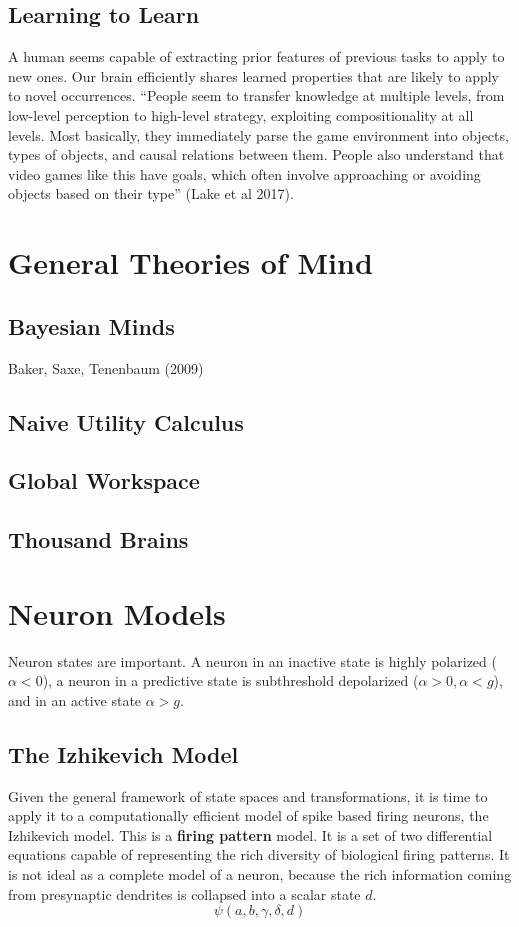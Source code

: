 \documentclass[11pt, a4paper]{article}
\begin{document}
\subsection{Learning to Learn}
A human seems capable of extracting prior features of previous tasks to apply to new ones. Our brain efficiently shares learned properties that are likely to apply to novel occurrences. ``People seem to transfer knowledge at multiple levels, from low-level perception to high-level strategy, exploiting compositionality at all levels. Most basically, they immediately parse the game environment into objects, types of objects, and causal relations between them. People also understand that video games like this have goals, which often involve approaching or avoiding objects based on their type'' (Lake et al 2017).

\section{General Theories of Mind}
\subsection{Bayesian Minds}
Baker, Saxe, Tenenbaum (2009)

\subsection{Naive Utility Calculus}

\subsection{Global Workspace}

\subsection{Thousand Brains}




\section{Neuron Models}
Neuron states are important. A neuron in an inactive state is highly polarized ($\alpha < 0$), a neuron in a predictive state is subthreshold depolarized ($\alpha > 0, \alpha < g$), and in an active state $\alpha > g$.


\subsection{The Izhikevich Model}
Given the general framework of state spaces and transformations, it is time to apply it to a computationally efficient model of spike based firing neurons, the Izhikevich model. This is a \textbf{firing pattern} model. It is a set of two differential equations capable of representing the rich diversity of biological firing patterns. It is not ideal as a complete model of a neuron, because the rich information coming from presynaptic dendrites is collapsed into a scalar state $d$.
\begin{equation}
    \psi(a,b,\gamma, \delta, d)
\end{equation}
\end{document}
